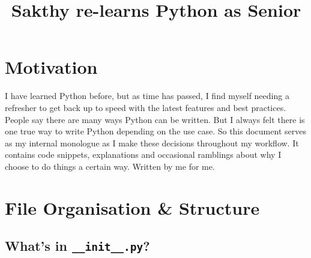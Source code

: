 \documentclass[11pt]{article}
\title{Sakthy re-learns Python as Senior}
\begin{document}
\maketitle
\tableofcontents
\newpage

\section{Motivation}
I have learned Python before, but as time has passed, I find myself needing a refresher to get back up to speed with the latest features and best practices. People say there are many ways Python can be written. But I always felt there is one true way to write Python depending on the use case. So this document serves as my internal monologue as I make these decisions throughout my workflow. It contains code snippets, explanations and occasional ramblings about why I choose to do things a certain way. Written by me for me.

\section{File Organisation \& Structure}

\subsection{What's in \texttt{\_\_init\_\_.py}?}
\end{document}

